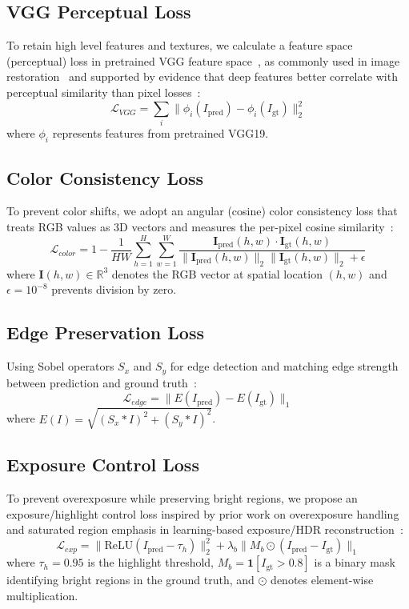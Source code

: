 \documentclass[conference]{IEEEtran}
\begin{document}
\subsection{VGG Perceptual Loss}
To retain high level features and textures, we calculate a feature space (perceptual) loss in pretrained VGG feature space~\cite{simonyan2014vgg}, as commonly used in image restoration~\cite{ledig2016srgan} and supported by evidence that deep features better correlate with perceptual similarity than pixel losses~\cite{zhang2018lpips}:
\begin{equation}
\mathcal{L}_{VGG} = \sum_{i} \|\phi_i(I_{\text{pred}}) - \phi_i(I_{\text{gt}})\|_2^2
\end{equation}
where $\phi_i$ represents features from pretrained VGG19.

\subsection{Color Consistency Loss}
To prevent color shifts, we adopt an angular (cosine) color consistency loss that treats RGB values as 3D vectors and measures the per-pixel cosine similarity~\cite{park2023dualcolor}:
\begin{equation}
\mathcal{L}_{color} = 1 - \frac{1}{HW}\sum_{h=1}^{H}\sum_{w=1}^{W} 
\frac{\mathbf{I}_{\text{pred}}(h,w) \cdot \mathbf{I}_{\text{gt}}(h,w)}
{\|\mathbf{I}_{\text{pred}}(h,w)\|_2 \|\mathbf{I}_{\text{gt}}(h,w)\|_2 + \epsilon}
\end{equation}
where $\mathbf{I}(h,w) \in \mathbb{R}^3$ denotes the RGB vector at spatial 
location $(h,w)$ and $\epsilon=10^{-8}$ prevents division by zero.

\subsection{Edge Preservation Loss}
Using Sobel operators $S_x$ and $S_y$ for edge detection and matching edge strength between prediction and ground truth~\cite{edrnet2025edgematching}:
\begin{equation}
\mathcal{L}_{edge} = \|E(I_{\text{pred}}) - E(I_{\text{gt}})\|_1
\end{equation}
where $E(I) = \sqrt{(S_x * I)^2 + (S_y * I)^2}$.

\subsection{Exposure Control Loss}
To prevent overexposure while preserving bright regions, we propose an exposure/highlight control loss inspired by prior work on overexposure handling and saturated region emphasis in learning-based exposure/HDR reconstruction~\cite{rlunet2024overexposure,afifi2021exposurecorrection,lee2022hsvnet,eilertsen2017singlehdr}:
\begin{equation}
\mathcal{L}_{exp} = \|\text{ReLU}(I_{\text{pred}} - \tau_h)\|_2^2 + 
\lambda_b \|M_b \odot (I_{\text{pred}} - I_{\text{gt}})\|_1
\end{equation}
where $\tau_h = 0.95$ is the highlight threshold, 
$M_b = \mathbf{1}[I_{\text{gt}} > 0.8]$ is a binary mask identifying 
bright regions in the ground truth, and $\odot$ denotes element-wise multiplication.
\end{document}
